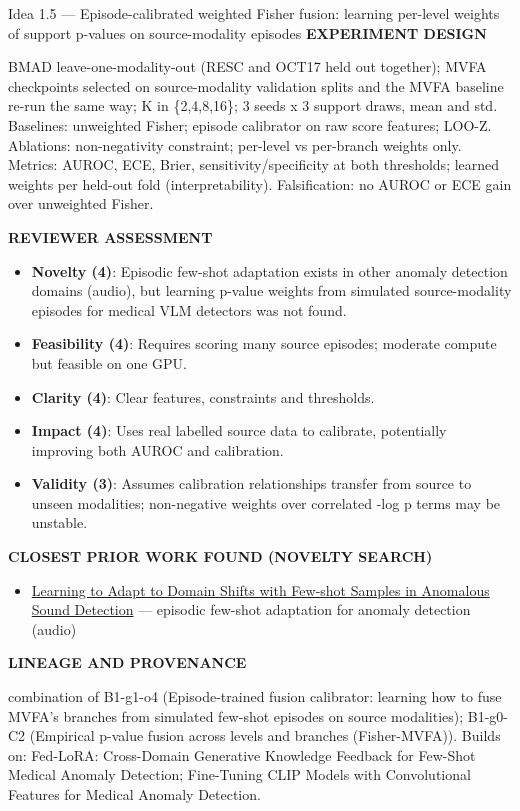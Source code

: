 \documentclass[11pt,a4paper]{article}
\newcommand{\lbl}[1]{{\sffamily\footnotesize\bfseries\color{muted}\MakeUppercase{#1}}\par}
\begin{document}
\begin{ideabox}{Idea 1.5 — Episode-calibrated weighted Fisher fusion: learning per-level weights of support p-values on source-modality episodes}
\lbl{Experiment design}BMAD leave-one-modality-out (RESC and OCT17 held out together); MVFA checkpoints selected on source-modality validation splits and the MVFA baseline re-run the same way; K in \{2,4,8,16\}; 3 seeds x 3 support draws, mean and std. Baselines: unweighted Fisher; episode calibrator on raw score features; LOO-Z. Ablations: non-negativity constraint; per-level vs per-branch weights only. Metrics: AUROC, ECE, Brier, sensitivity/specificity at both thresholds; learned weights per held-out fold (interpretability). Falsification: no AUROC or ECE gain over unweighted Fisher.

\lbl{Reviewer assessment}\begin{itemize}[leftmargin=1.2em,itemsep=1pt,topsep=2pt]
\item \textbf{Novelty (4)}: Episodic few-shot adaptation exists in other anomaly detection domains (audio), but learning p-value weights from simulated source-modality episodes for medical VLM detectors was not found.
\item \textbf{Feasibility (4)}: Requires scoring many source episodes; moderate compute but feasible on one GPU.
\item \textbf{Clarity (4)}: Clear features, constraints and thresholds.
\item \textbf{Impact (4)}: Uses real labelled source data to calibrate, potentially improving both AUROC and calibration.
\item \textbf{Validity (3)}: Assumes calibration relationships transfer from source to unseen modalities; non-negative weights over correlated -log p terms may be unstable.
\end{itemize}
\lbl{Closest prior work found (novelty search)}\begin{itemize}[leftmargin=1.2em,itemsep=1pt,topsep=2pt]
\item \href{https://arxiv.org/pdf/2204.01905}{Learning to Adapt to Domain Shifts with Few-shot Samples in Anomalous Sound Detection} — episodic few-shot adaptation for anomaly detection (audio)
\end{itemize}
\lbl{Lineage and provenance}{\small combination of B1-g1-o4 (Episode-trained fusion calibrator: learning how to fuse MVFA's branches from simulated few-shot episodes on source modalities); B1-g0-C2 (Empirical p-value fusion across levels and branches (Fisher-MVFA)). Builds on: Fed-LoRA: Cross-Domain Generative Knowledge Feedback for Few-Shot Medical Anomaly Detection; Fine-Tuning CLIP Models with Convolutional Features for Medical Anomaly Detection.}
\end{ideabox}
\end{document}
